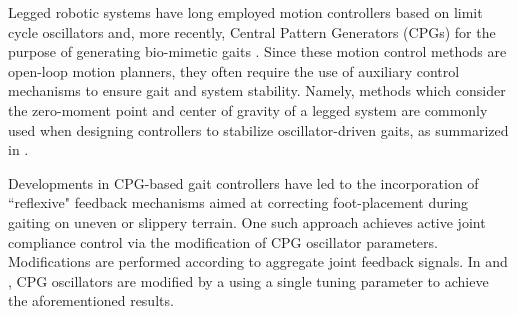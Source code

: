 
Legged robotic systems have long employed motion controllers based on limit cycle oscillators and, more recently, Central Pattern Generators (CPGs)  for the purpose of generating bio-mimetic gaits \cite{Matsuoka1985,Collins1993,Endo2004,Righetti2006,Ijspeert2008,Matos2010,Ajallooeian2013,Park2014,Fukuoka2015}. Since these motion control methods are open-loop motion planners, 
they often require the use of auxiliary control mechanisms to ensure gait and system stability. Namely, methods which consider the zero-moment point and center of gravity of a legged system are commonly used when designing controllers to stabilize oscillator-driven gaits, as summarized in \cite{Wieber2015}. %

Developments in CPG-based gait controllers have led to the incorporation of ``reflexive" feedback mechanisms aimed at correcting foot-placement during gaiting on uneven or slippery terrain. One such approach achieves active joint compliance control via the modification of CPG oscillator parameters. Modifications are performed according to aggregate joint feedback signals. In \cite{Endo2004} and \cite{Fukuoka2003}, CPG oscillators are modified by a using a single tuning parameter to achieve the aforementioned results.


